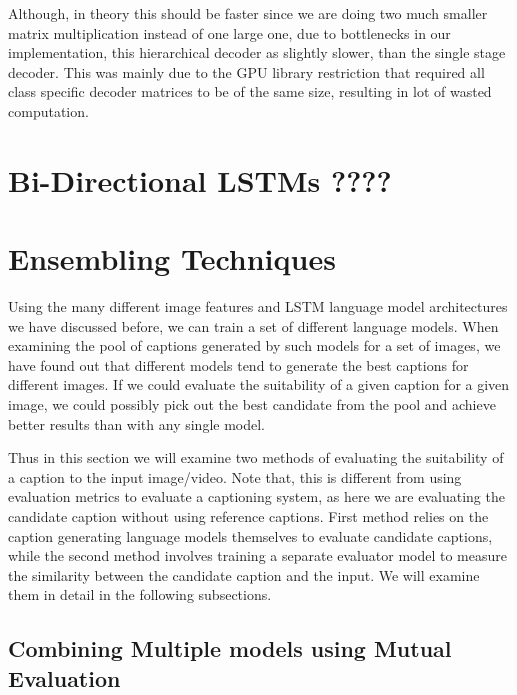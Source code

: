 Although, in theory this should be faster since we are doing two much smaller
matrix multiplication instead of one large one, due to bottlenecks in our
implementation, this hierarchical decoder as slightly slower, than the single
stage decoder.
This was mainly due to the GPU library restriction that required all class
specific decoder matrices to be of the same size, resulting in lot of wasted
computation.
\section{Bi-Directional LSTMs ????}
\section{Ensembling Techniques}
Using the many different image features and LSTM language model architectures we
have discussed before, we can train a set of different language models.
When examining the pool of captions generated by such models for a set of
images, we have found out that different models tend to generate the best
captions for different images.
If we could evaluate the suitability of a given caption for a given image, we
could possibly pick out the best candidate from the pool and achieve better
results than with any single model.

Thus in this section we will examine two methods of evaluating the suitability
of a caption to the input image/video.
Note that, this is different from using evaluation metrics to evaluate a
captioning system, as here we are evaluating the candidate caption without using
reference captions.
First method relies on the caption generating language models themselves to
evaluate candidate captions, while the second method involves training a
separate evaluator model to measure the similarity between the candidate caption
and the input.
We will examine them in detail in the following subsections.

\subsection{Combining Multiple models using Mutual Evaluation}

